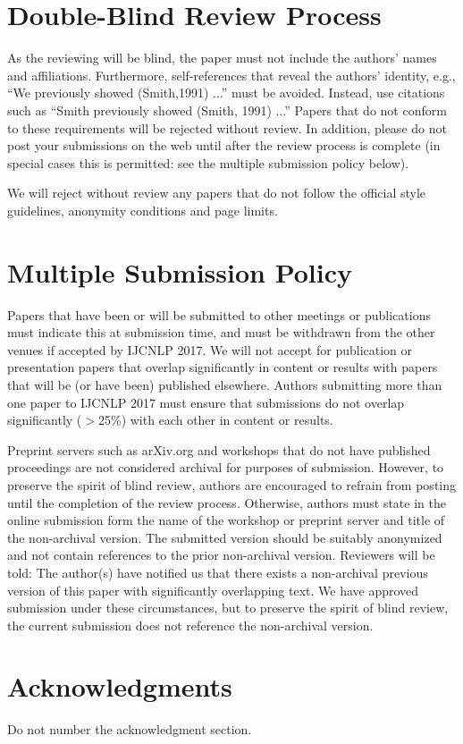 \documentclass[11pt,letterpaper]{article}
\begin{document}
\section{Double-Blind Review Process}
\label{sec:blind}

As the reviewing will be blind, the paper must not include the authors' names and
affiliations.  Furthermore, self-references that reveal the authors' identity,
e.g., ``We previously showed (Smith,1991) ...'' must be avoided. Instead, use
citations such as ``Smith previously showed (Smith, 1991) ...'' Papers that do
not conform to these requirements will be rejected without review. In addition,
please do not post your submissions on the web until after the review process is
complete (in special cases this is permitted: see the multiple submission policy
below).

We will reject without review any papers that do not follow the official style
guidelines, anonymity conditions and page limits.

\section{Multiple Submission Policy}
Papers that have been or will be submitted to other meetings or publications must indicate this at submission time, and must be withdrawn from the other venues if accepted by IJCNLP 2017. We will not accept for publication or presentation papers that overlap significantly in content or results with papers that will be (or have been) published elsewhere. Authors submitting more than one paper to IJCNLP 2017 must ensure that submissions do not overlap significantly ($>$25\%) with each other in content or results.

Preprint servers such as arXiv.org and workshops that do not have published proceedings are not considered archival for purposes of submission. However, to preserve the spirit of blind review, authors are encouraged to refrain from posting until the completion of the review process. Otherwise, authors must state in the online submission form the name of the workshop or preprint server and title of the non-archival version. The submitted version should be suitably anonymized and not contain references to the prior non-archival version. Reviewers will be told: The author(s) have notified us that there exists a non-archival previous version of this paper with significantly overlapping text. We have approved submission under these circumstances, but to preserve the spirit of blind review, the current submission does not reference the non-archival version.

\section*{Acknowledgments}

Do not number the acknowledgment section.



\end{document}

